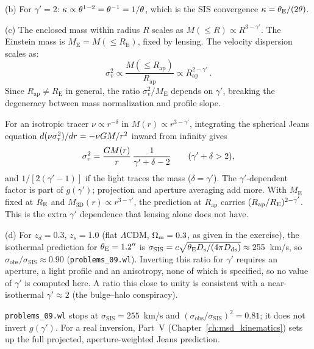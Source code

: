 (b) For $\gamma' = 2$:
$\kappa \propto \theta^{1-2} = \theta^{-1} = 1/\theta$, which
is the SIS convergence $\kappa = \theta_{\mathrm{E}}/(2\theta)$. \checkmark

(c) The enclosed mass within radius $R$ scales as
$M(\le R) \propto R^{3-\gamma'}$.  The Einstein mass is
$M_{\mathrm{E}} = M(\le R_{\mathrm{E}})$, fixed by lensing.
The velocity dispersion scales as:
\begin{equation*}
    \sigma_v^2 \propto \frac{M(\le R_{\mathrm{ap}})}{R_{\mathrm{ap}}}
    \propto R_{\mathrm{ap}}^{2-\gamma'} \,.
\end{equation*}
Since $R_{\mathrm{ap}} \neq R_{\mathrm{E}}$ in general, the ratio
$\sigma_v^2/M_{\mathrm{E}}$ depends on $\gamma'$, breaking the
degeneracy between mass normalization and profile slope. \checkmark

\begin{derivation}
For an isotropic tracer $\nu \propto r^{-\delta}$ in $M(r) \propto
r^{3-\gamma'}$, integrating the spherical Jeans equation
$d(\nu\sigma_r^2)/dr = -\nu G M/r^2$ inward from infinity gives
\[
  \sigma_r^2 = \frac{G M(r)}{r}\,\frac{1}{\gamma'+\delta-2}
  \qquad(\gamma'+\delta > 2),
\]
and $1/[2(\gamma'-1)]$ if the light traces the mass ($\delta = \gamma'$).  The
$\gamma'$-dependent factor is part of $g(\gamma')$; projection and aperture
averaging add more.  With $M_{\mathrm{E}}$ fixed at $R_{\mathrm{E}}$ and
$M_{\mathrm{3D}}(r) \propto r^{3-\gamma'}$, the prediction at $R_{\mathrm{ap}}$
carries $(R_{\mathrm{ap}}/R_{\mathrm{E}})^{2-\gamma'}$.  This is the extra $\gamma'$
dependence that lensing alone does not have.
\end{derivation}


(d) For $z_d = 0.3$, $z_s = 1.0$ (flat $\Lambda$CDM,
$\Omega_{\mathrm{m}} = 0.3$, as given in the exercise), the isothermal prediction
for $\theta_{\mathrm{E}} = 1.2''$ is
$\sigma_{\mathrm{SIS}} = c\sqrt{\theta_{\mathrm{E}}D_{\mathrm{s}}/(4\pi D_{\mathrm{ds}})}
\approx 255$~km/s, so $\sigma_{\mathrm{obs}}/\sigma_{\mathrm{SIS}}
\approx 0.90$ (\texttt{problems\_09.wl}).  Inverting this ratio for
$\gamma'$ requires an aperture, a light profile and an anisotropy,
none of which is specified, so no value of $\gamma'$ is computed
here.  A ratio this close to unity is consistent with a
near-isothermal $\gamma' \approx 2$ (the bulge--halo conspiracy).
\checkmark

\begin{annotation}
\texttt{problems\_09.wl} stops at $\sigma_{\mathrm{SIS}} = 255$~km/s and
$(\sigma_{\mathrm{obs}}/\sigma_{\mathrm{SIS}})^2 = 0.81$; it does not invert
$g(\gamma')$.  For a real inversion, Part~V
(Chapter~\ref{ch:msd_kinematics}) sets up the full projected,
aperture-weighted Jeans prediction.
\end{annotation}


